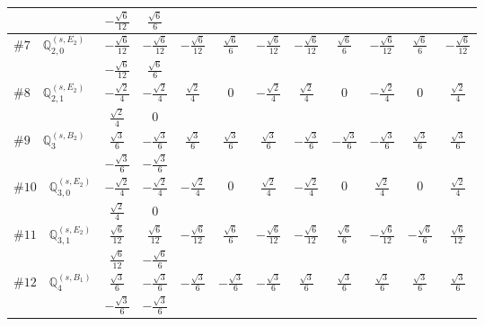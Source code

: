 \documentclass[fleqn,9pt,landscape]{jsarticle}
\begin{document}
\begin{center}
\begin{longtable}{lcccccccccc}
& $ - \frac{\sqrt{6}}{12} $ & $ \frac{\sqrt{6}}{6} $ & $  $ & $  $ & $  $ & $  $ & $  $ & $  $ & $  $ & $  $ \\ \hline
$ \#7\quad \mathbb{Q}_{2,0}^{(s,E_{2})} $ & $ - \frac{\sqrt{6}}{12} $ & $ - \frac{\sqrt{6}}{12} $ & $ - \frac{\sqrt{6}}{12} $ & $ \frac{\sqrt{6}}{6} $ & $ - \frac{\sqrt{6}}{12} $ & $ - \frac{\sqrt{6}}{12} $ & $ \frac{\sqrt{6}}{6} $ & $ - \frac{\sqrt{6}}{12} $ & $ \frac{\sqrt{6}}{6} $ & $ - \frac{\sqrt{6}}{12} $ \\
& $ - \frac{\sqrt{6}}{12} $ & $ \frac{\sqrt{6}}{6} $ & $  $ & $  $ & $  $ & $  $ & $  $ & $  $ & $  $ & $  $ \\ \hline
$ \#8\quad \mathbb{Q}_{2,1}^{(s,E_{2})} $ & $ - \frac{\sqrt{2}}{4} $ & $ - \frac{\sqrt{2}}{4} $ & $ \frac{\sqrt{2}}{4} $ & $ 0 $ & $ - \frac{\sqrt{2}}{4} $ & $ \frac{\sqrt{2}}{4} $ & $ 0 $ & $ - \frac{\sqrt{2}}{4} $ & $ 0 $ & $ \frac{\sqrt{2}}{4} $ \\
& $ \frac{\sqrt{2}}{4} $ & $ 0 $ & $  $ & $  $ & $  $ & $  $ & $  $ & $  $ & $  $ & $  $ \\ \hline
$ \#9\quad \mathbb{Q}_{3}^{(s,B_{2})} $ & $ \frac{\sqrt{3}}{6} $ & $ - \frac{\sqrt{3}}{6} $ & $ \frac{\sqrt{3}}{6} $ & $ \frac{\sqrt{3}}{6} $ & $ \frac{\sqrt{3}}{6} $ & $ - \frac{\sqrt{3}}{6} $ & $ - \frac{\sqrt{3}}{6} $ & $ - \frac{\sqrt{3}}{6} $ & $ \frac{\sqrt{3}}{6} $ & $ \frac{\sqrt{3}}{6} $ \\
& $ - \frac{\sqrt{3}}{6} $ & $ - \frac{\sqrt{3}}{6} $ & $  $ & $  $ & $  $ & $  $ & $  $ & $  $ & $  $ & $  $ \\ \hline
$ \#10\quad \mathbb{Q}_{3,0}^{(s,E_{2})} $ & $ - \frac{\sqrt{2}}{4} $ & $ - \frac{\sqrt{2}}{4} $ & $ - \frac{\sqrt{2}}{4} $ & $ 0 $ & $ \frac{\sqrt{2}}{4} $ & $ - \frac{\sqrt{2}}{4} $ & $ 0 $ & $ \frac{\sqrt{2}}{4} $ & $ 0 $ & $ \frac{\sqrt{2}}{4} $ \\
& $ \frac{\sqrt{2}}{4} $ & $ 0 $ & $  $ & $  $ & $  $ & $  $ & $  $ & $  $ & $  $ & $  $ \\ \hline
$ \#11\quad \mathbb{Q}_{3,1}^{(s,E_{2})} $ & $ \frac{\sqrt{6}}{12} $ & $ \frac{\sqrt{6}}{12} $ & $ - \frac{\sqrt{6}}{12} $ & $ \frac{\sqrt{6}}{6} $ & $ - \frac{\sqrt{6}}{12} $ & $ - \frac{\sqrt{6}}{12} $ & $ \frac{\sqrt{6}}{6} $ & $ - \frac{\sqrt{6}}{12} $ & $ - \frac{\sqrt{6}}{6} $ & $ \frac{\sqrt{6}}{12} $ \\
& $ \frac{\sqrt{6}}{12} $ & $ - \frac{\sqrt{6}}{6} $ & $  $ & $  $ & $  $ & $  $ & $  $ & $  $ & $  $ & $  $ \\ \hline
$ \#12\quad \mathbb{Q}_{4}^{(s,B_{1})} $ & $ \frac{\sqrt{3}}{6} $ & $ - \frac{\sqrt{3}}{6} $ & $ - \frac{\sqrt{3}}{6} $ & $ - \frac{\sqrt{3}}{6} $ & $ - \frac{\sqrt{3}}{6} $ & $ \frac{\sqrt{3}}{6} $ & $ \frac{\sqrt{3}}{6} $ & $ \frac{\sqrt{3}}{6} $ & $ \frac{\sqrt{3}}{6} $ & $ \frac{\sqrt{3}}{6} $ \\
& $ - \frac{\sqrt{3}}{6} $ & $ - \frac{\sqrt{3}}{6} $ & $  $ & $  $ & $  $ & $  $ & $  $ & $  $ & $  $ & $  $ \\
\end{longtable}
\end{center}
\end{document}
